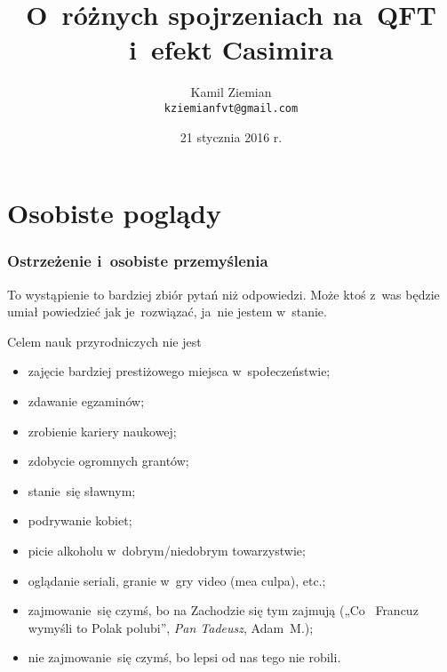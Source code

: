 \documentclass[10pt,t]{beamer}
\title{O~różnych spojrzeniach na~QFT i~efekt Casimira}
\author{Kamil Ziemian \\
  \texttt{kziemianfvt@gmail.com} }
\date[21 I 2016]{21 stycznia 2016 r.}
\begin{document}






\RaggedRight





\maketitle





\section{Osobiste poglądy}



\begin{frame}
  \frametitle{Ostrzeżenie i~osobiste przemyślenia}


  To wystąpienie to bardziej zbiór pytań niż odpowiedzi. Może ktoś z~was
  będzie umiał powiedzieć jak je~rozwiązać, ja~nie jestem w~stanie.

  Celem nauk przyrodniczych nie jest
  \begin{itemize}

  \item zajęcie bardziej prestiżowego miejsca w~społeczeństwie;

  \item zdawanie egzaminów;

  \item zrobienie kariery naukowej;

  \item zdobycie ogromnych grantów;

  \item stanie~się sławnym;

  \item podrywanie kobiet;

  \item picie alkoholu w~dobrym/niedobrym towarzystwie;

  \item oglądanie seriali, granie w~gry video (mea culpa), etc.;

  \item zajmowanie~się czymś, bo na Zachodzie się tym zajmują
    („Co~ Francuz wymyśli to Polak polubi”, \textit{Pan Tadeusz}, Adam~M.);

  \item nie zajmowanie~się czymś, bo lepsi od nas tego nie
    robili.

  \end{itemize}

\end{frame}
\end{document}
